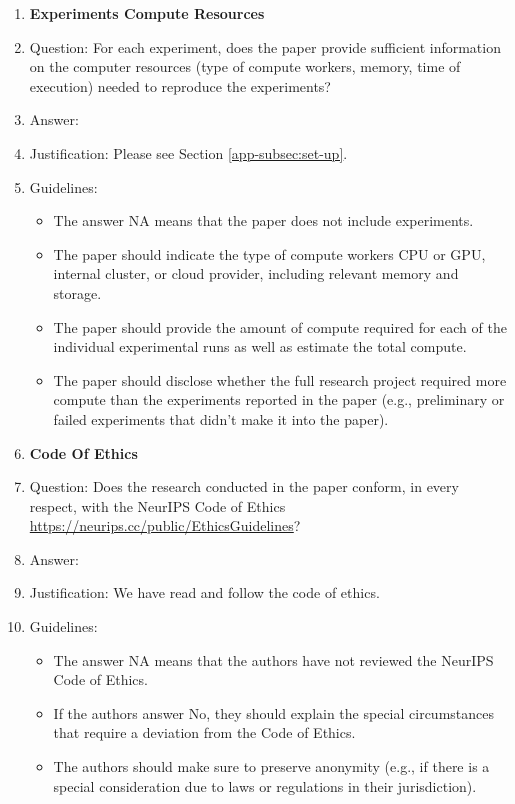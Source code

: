 \documentclass{article}
\begin{document}
\begin{enumerate}
\item {\bf Experiments Compute Resources}
    \item[] Question: For each experiment, does the paper provide sufficient information on the computer resources (type of compute workers, memory, time of execution) needed to reproduce the experiments?
    \item[] Answer: \answerYes{} %
    \item[] Justification: Please see Section \ref{app-subsec:set-up}.
    \item[] Guidelines:
    \begin{itemize}
        \item The answer NA means that the paper does not include experiments.
        \item The paper should indicate the type of compute workers CPU or GPU, internal cluster, or cloud provider, including relevant memory and storage.
        \item The paper should provide the amount of compute required for each of the individual experimental runs as well as estimate the total compute. 
        \item The paper should disclose whether the full research project required more compute than the experiments reported in the paper (e.g., preliminary or failed experiments that didn't make it into the paper). 
    \end{itemize}
    
\item {\bf Code Of Ethics}
    \item[] Question: Does the research conducted in the paper conform, in every respect, with the NeurIPS Code of Ethics \url{https://neurips.cc/public/EthicsGuidelines}?
    \item[] Answer: \answerYes{} %
    \item[] Justification: We have read and follow the code of ethics.
    \item[] Guidelines:
    \begin{itemize}
        \item The answer NA means that the authors have not reviewed the NeurIPS Code of Ethics.
        \item If the authors answer No, they should explain the special circumstances that require a deviation from the Code of Ethics.
        \item The authors should make sure to preserve anonymity (e.g., if there is a special consideration due to laws or regulations in their jurisdiction).
    \end{itemize}



\end{enumerate}
\end{document}
